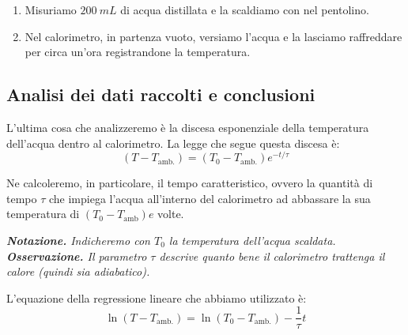 \documentclass{article}
\begin{document}
\begin{enumerate}
    \item
        Misuriamo $\qty{200}{mL}$ di acqua distillata e la scaldiamo con nel
        pentolino.    %
    \item 
        Nel calorimetro, in partenza vuoto, versiamo l'acqua e la lasciamo
        raffreddare per circa un'ora registrandone la temperatura.
\end{enumerate}

\subsection{Analisi dei dati raccolti e conclusioni}
L'ultima cosa che analizzeremo è la discesa esponenziale della temperatura    %
dell'acqua dentro al calorimetro. La legge che segue questa discesa è:
    \[    
        (T-T_\text{amb.})=(T_0-T_\text{amb.}) e^{-t/\tau}
    \]

Ne calcoleremo, in particolare, il tempo caratteristico, ovvero la quantità
di tempo $\tau$ che impiega l'acqua all'interno del calorimetro ad abbassare
la sua temperatura di $(T_0 - T_\text{amb})e$ volte. 

\emph{
        \textbf{Notazione.} Indicheremo con $T_0$ la temperatura
        dell'acqua scaldata.
        }
\emph{
        \textbf{Osservazione.} Il parametro $\tau$ descrive quanto bene il
        calorimetro trattenga il calore (quindi sia adiabatico). 
        }

L'equazione della regressione lineare che abbiamo utilizzato è:
    \[
        \ln(T-T_\text{amb.})=\ln(T_0-T_\text{amb.})-\frac{1}{\tau}t
    \]
\end{document}
